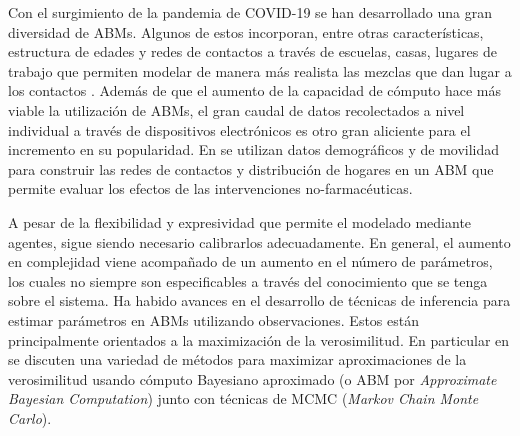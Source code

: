 Con el surgimiento de la pandemia de COVID-19 se han desarrollado una gran diversidad de ABMs. Algunos de estos incorporan, entre otras características, estructura de edades y redes de contactos a través de escuelas, casas, lugares de trabajo que permiten modelar de manera más realista las mezclas que dan lugar a los contactos \citep{Kerr2020,Flaxman2020,Simoy2021}. Además de que el aumento de la capacidad de cómputo hace más viable la utilización de ABMs, el gran caudal de datos recolectados a nivel individual a través de dispositivos electrónicos es otro gran aliciente para el incremento en su popularidad. En \cite{Aleta2020} se utilizan datos demográficos y de movilidad para construir las redes de contactos y distribución de hogares en un ABM que permite evaluar los efectos de las intervenciones no-farmacéuticas.

A pesar de la flexibilidad y expresividad que permite el modelado mediante agentes, sigue siendo necesario calibrarlos adecuadamente. En general, el aumento en complejidad viene acompañado de un aumento en el número de parámetros, los cuales no siempre son especificables a través del conocimiento que se tenga sobre el sistema. Ha habido avances en el desarrollo de técnicas de inferencia para estimar parámetros en ABMs utilizando observaciones. Estos están principalmente orientados a la maximización de la verosimilitud. En particular en \cite{Hooten2020} se discuten una variedad de métodos para maximizar aproximaciones de la verosimilitud usando cómputo Bayesiano aproximado (o ABM por \textit{Approximate Bayesian Computation}) junto con técnicas de MCMC (\textit{Markov Chain Monte Carlo}).

